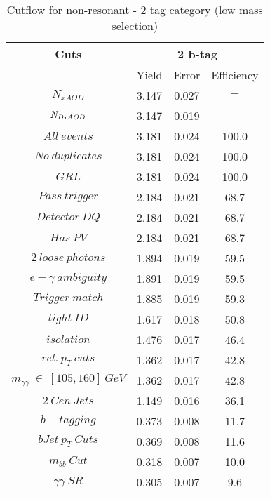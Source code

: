 \begin{table}\footnotesize
\begin{center}
\caption{Cutflow for non-resonant \hhyybb - 2 tag category (low mass selection)}
\label{tab:cutflow-nonres-2tag-low}
\begin{tabular}{|c|c|c|c|}
 \hline
Cuts& \multicolumn{3}{c|}{2 b-tag} \\ \hline
 &Yield&Error&Efficiency\\ \hline
$N_{xAOD}$ & 3.147&0.027 &$-$ \\
 \hline
$\it{N}_{DxAOD}$ & 3.147&0.019 &$-$ \\
 \hline
$All\ events$ & 3.181&0.024 &100.0 \\
 \hline
$No\ duplicates$ & 3.181&0.024 &100.0 \\
 \hline
$GRL$ & 3.181&0.024 &100.0 \\
 \hline
$Pass\ trigger$ & 2.184&0.021 &68.7 \\
 \hline
$Detector\ DQ$ & 2.184&0.021 &68.7 \\
 \hline
$Has\ PV$ & 2.184&0.021 &68.7 \\
 \hline
$2\ loose\ photons$ & 1.894&0.019 &59.5 \\
 \hline
$e-\gamma\ ambiguity$ & 1.891&0.019 &59.5 \\
 \hline
$Trigger\ match$ & 1.885&0.019 &59.3 \\
 \hline
$tight\ ID$ & 1.617&0.018 &50.8 \\
 \hline
$isolation$ & 1.476&0.017 &46.4 \\
 \hline
$rel.\ p_{T}\ cuts$ & 1.362&0.017 &42.8 \\
 \hline
$m_{\gamma\gamma}\ \in\ [105,160]\ GeV$ & 1.362&0.017 &42.8 \\
 \hline
$2\ Cen\ Jets$ & 1.149&0.016 &36.1 \\
 \hline
$b-tagging$ & 0.373&0.008 &11.7 \\
 \hline
$bJet\ p_{T}\ Cuts$ & 0.369&0.008 &11.6 \\
 \hline
$m_{bb}\ Cut$ & 0.318&0.007 &10.0 \\
 \hline
$\gamma\gamma\ SR$ & 0.305&0.007 & 9.6 \\
 \hline
\end{tabular}
\end{center}
\end{table}
